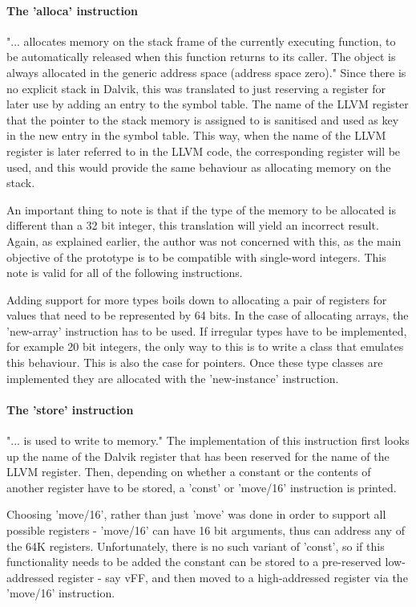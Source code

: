 \documentclass[parskip]{cs4rep}
\begin{document}
\paragraph{The 'alloca' instruction} "... allocates memory on the stack frame of the currently executing function, to be automatically released when this function returns to its caller. The object is always allocated in the generic address space (address space zero)."\cite{P11} Since there is no explicit stack in Dalvik, this was translated to just reserving a register for later use by adding an entry to the symbol table. The name of the LLVM register that the pointer to the stack memory is assigned to is sanitised and used as key in the new entry in the symbol table. This way, when the name of the LLVM register is later referred to in the LLVM code, the corresponding register will be used, and this would provide the same behaviour as allocating memory on the stack.

An important thing to note is that if the type of the memory to be allocated is different than a 32 bit integer, this translation will yield an incorrect result. Again, as explained earlier, the author was not concerned with this, as the main objective of the prototype is to be compatible with single-word integers. This note is valid for all of the following instructions.

Adding support for more types boils down to allocating a pair of registers for values that need to be represented by 64 bits. In the case of allocating arrays, the 'new-array' instruction has to be used. If irregular types have to be implemented, for example 20 bit integers, the only way to this is to write a class that emulates this behaviour. This is also the case for pointers. Once these type classes are implemented they are allocated with the 'new-instance' instruction.

\paragraph{The 'store' instruction} "... is used to write to memory."\cite{P11} The implementation of this instruction first looks up the name of the Dalvik register that has been reserved for the name of the LLVM register. Then, depending on whether a constant or the contents of another register have to be stored, a 'const' or 'move/16' instruction is printed.

Choosing 'move/16', rather than just 'move' was done in order to support all possible registers - 'move/16' can have 16 bit arguments, thus can address any of the 64K registers. Unfortunately, there is no such variant of 'const', so if this functionality needs to be added the constant can be stored to a pre-reserved low-addressed register - say vFF, and then moved to a high-addressed register via the 'move/16' instruction.
\end{document}
